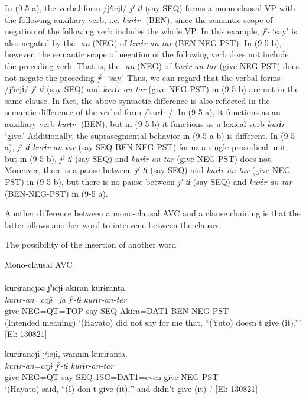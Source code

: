 In (9-5 a), the verbal form /jˀicjɨ/ \textit{jˀ-tɨ} (say-SEQ) forms a mono-clausal VP with the following auxiliary verb, i.e. \textit{kurɨr-} (BEN), since the semantic scope of negation of the following verb includes the whole VP. In this example, \textit{jˀ-} ‘say’ is also negated by the \textit{{}-an} (NEG) of \textit{kurɨr-an-tar} (BEN-NEG-PST). In (9-5 b), however, the semantic scope of negation of the following verb does not include the preceding verb. That is, the \textit{{}-an} (NEG) of \textit{kurɨr-an-tar} (give-NEG-PST) does not negate the preceding \textit{jˀ-} ‘say.’ Thus, we can regard that the verbal forms /jˀicjɨ/ \textit{jˀ-tɨ} (say-SEQ) and \textit{kurɨr-an-tar} (give-NEG-PST) in (9-5 b) are not in the same clause. In fact, the above syntactic difference is also reflected in the semantic difference of the verbal form /kurɨr-/. In (9-5 a), it functions as an auxiliary verb \textit{kurɨr-} (BEN), but in (9-5 b) it functions as a lexical verb \textit{kurɨr-} ‘give.’ Additionally, the suprasegmental behavior in (9-5 a-b) is different. In (9-5 a), \textit{jˀ-tɨ} \textit{kurɨr-an-tar} (say-SEQ BEN-NEG-PST) forms a single prosodical unit, but in (9-5 b), \textit{jˀ-tɨ} (say-SEQ) and \textit{kurɨr-an-tar} (give-NEG-PST) does not. Moreover, there is a pause between \textit{jˀ-tɨ} (say-SEQ) and \textit{kurɨr-an-tar} (give-NEG-PST) in (9-5 b), but there is no pause between \textit{jˀ-tɨ} (say-SEQ) and \textit{kurɨr-an-tar} (BEN-NEG-PST) in (9-5 a).

Another difference between a mono-clausal AVC and a clause chaining is that the latter allows another word to intervene between the clauses.

\ea   The possibility of the insertion of another word \label{ex:9.6}

  \ea \label{ex:9.6a}Mono-clausal AVC\\\\
 \glll  *kurɨrancjəə  jˀicjɨ  akiran  kurɨranta.\\
    \textit{kurɨr-an=ccjɨ=ja}  \textit{jˀ-tɨ}  \textit{}  \textit{kurɨr-an-tar}\\
    give-NEG=QT=TOP  say-SEQ  Akira=DAT1  BEN-NEG-PST\\
    \glt     (Intended meaning) ‘(Hayato) did not say  for me that, “(Yuto) doesn’t give (it).”’ [El: 130821]

  \ex\label{ex:9.6b}

 \glll  kurɨrancjɨ  jˀicjɨ,  wannin  kurɨranta.\\
    \textit{kurɨr-an=ccjɨ}  \textit{jˀ-tɨ}  \textit{}  \textit{kurɨr-an-tar}\\
    give-NEG=QT  say-SEQ  1SG=DAT1=even  give-NEG-PST\\
    \glt     ‘(Hayato) said, “(I) don’t give (it),” and didn’t give (it) .’ [El: 130821]
    \z
\z

